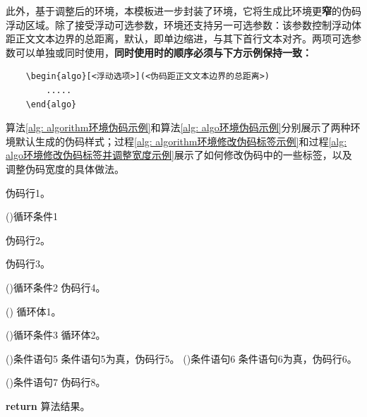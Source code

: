 此外，基于调整后的环境，本模板进一步封装了环境，它将生成比环境更\textbf{\color{DarkRed}窄}的伪码浮动区域。除了接受浮动可选参数\shad{[htbp]}，环境还支持另一可选参数：该参数控制浮动体距正文文本边界的总距离，默认\shad{4em}，即单边缩进\shad{2em}，与其下首行文本对齐。两项可选参数可以单独或同时使用，\textbf{同时使用时的顺序必须与下方示例保持一致：}

\begin{verbatim}
    \begin{algo}[<浮动选项>](<伪码距正文文本边界的总距离>)
        .....
    \end{algo}
\end{verbatim}

算法\ref{alg: algorithm环境伪码示例}和算法\ref{alg: algo环境伪码示例}分别展示了两种环境默认生成的伪码样式；过程\ref{alg: algorithm环境修改伪码标签示例}和过程\ref{alg: algo环境修改伪码标签并调整宽度示例}展示了如何修改伪码中的一些标签，以及调整伪码宽度的具体做法。


\begin{algorithm}[!h]
    \caption{algorithm环境伪码示例} \label{alg: algorithm环境伪码示例}
    伪码行1。
    
    \For(){循环条件1}{
        伪码行2。
        
        伪码行3。
        
        \DoWhile(){循环条件2}{
            伪码行4。
        }
        
        \Loop(){
            循环体1。
        }
        
        \Repeat(){循环条件3}{
            循环体2。
        }
        
        \uIf(){条件语句5}{
            条件语句5为真，伪码行5。
        }
        \uElseIf(){条件语句6}{
            条件语句6为真，伪码行6。
        }
        
        \If(){条件语句7}{
            伪码行8。
        }
    }
    \textbf{return} 算法结果。
\end{algorithm}


